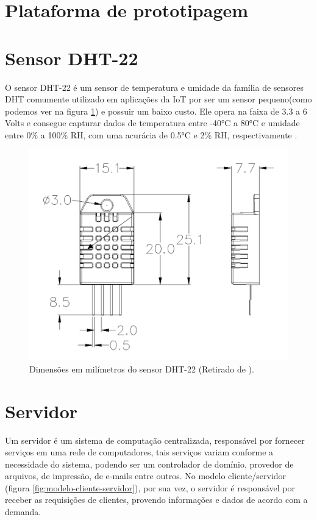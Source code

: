 \section{Plataforma de prototipagem}
\label{fund:plataforma-proto}

\section{Sensor DHT-22}
\label{fund:dht-22}
O sensor DHT-22 é um sensor de temperatura e umidade da família de sensores DHT comumente utilizado em aplicações da IoT por ser um sensor pequeno(como podemos ver na figura \ref{fig:dht-22}) e possuir um baixo custo. Ele opera na faixa de 3.3 a 6 Volts e consegue capturar dados de temperatura entre -40°C a 80°C e umidade entre 0\% a 100\% RH, com uma acurácia de 0.5°C e 2\% RH, respectivamente \cite{datasheetDHT22}.

\begin{figure}[H]
  \centering
  \includegraphics[width=.80\textwidth]{assets/dht-22.png} 
  \caption{Dimensões em milímetros do sensor DHT-22 (Retirado de \cite{datasheetDHT22}).}
  \label{fig:dht-22} 
\end{figure}

\section{Servidor}
\label{fund:servidor}
Um servidor é um sistema de computação centralizada, responsável por fornecer serviços em uma rede de computadores, tais serviços variam conforme a necessidade do sistema, podendo ser um controlador de domínio, provedor de arquivos, de impressão, de e-mails entre outros. No modelo cliente/servidor (figura \ref{fig:modelo-cliente-servidor}), por sua vez, o servidor é responsável por receber as requisições de clientes, provendo informações e dados de acordo com a demanda.

